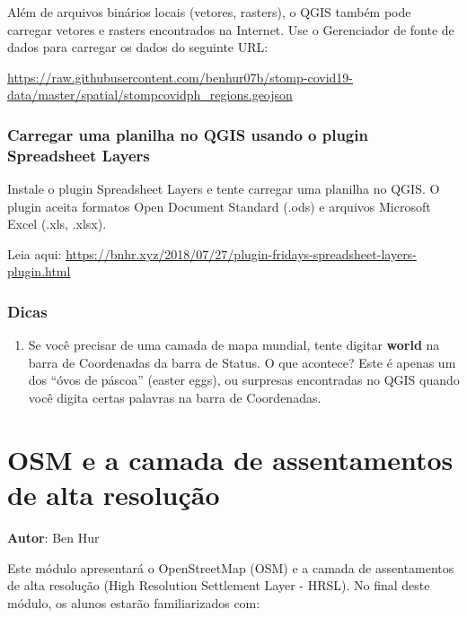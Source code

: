 \documentclass[
]{krantz}
\providecommand{\tightlist}{%
  \setlength{\itemsep}{0pt}\setlength{\parskip}{0pt}}
\begin{document}
Além de arquivos binários locais (vetores, rasters), o QGIS também pode carregar vetores e rasters encontrados na Internet. Use o Gerenciador de fonte de dados para carregar os dados do seguinte URL:

\url{https://raw.githubusercontent.com/benhur07b/stomp-covid19-data/master/spatial/stompcovidph_regions.geojson}

\hypertarget{carregar-uma-planilha-no-qgis-usando-o-plugin-spreadsheet-layers}{%
\subsection{Carregar uma planilha no QGIS usando o plugin Spreadsheet Layers}\label{carregar-uma-planilha-no-qgis-usando-o-plugin-spreadsheet-layers}}

Instale o plugin Spreadsheet Layers e tente carregar uma planilha no QGIS. O plugin aceita formatos Open Document Standard (.ods) e arquivos Microsoft Excel (.xls, .xlsx).

Leia aqui: \href{https://bnhr.xyz/2018/07/27/plugin-fridays-spreadsheet\%20-layers-plugin.html}{https://bnhr.xyz/2018/07/27/plugin-fridays-spreadsheet-layers-plugin.html}

\hypertarget{dicas}{%
\subsection{Dicas}\label{dicas}}

\begin{enumerate}
\def\labelenumi{\arabic{enumi}.}
\tightlist
\item
  Se você precisar de uma camada de mapa mundial, tente digitar \textbf{world} na barra de Coordenadas da barra de Status. O que acontece? Este é apenas um dos ``óvos de páscoa'' (easter eggs), ou surpresas encontradas no QGIS quando você digita certas palavras na barra de Coordenadas.
\end{enumerate}

\hypertarget{osm-e-a-camada-de-assentamentos-de-alta-resoluuxe7uxe3o}{%
\chapter{OSM e a camada de assentamentos de alta resolução}\label{osm-e-a-camada-de-assentamentos-de-alta-resoluuxe7uxe3o}}

\textbf{Autor}: Ben Hur

Este módulo apresentará o OpenStreetMap (OSM) e a camada de assentamentos de alta resolução (High Resolution Settlement Layer - HRSL). No final deste módulo, os alunos estarão familiarizados com:
\end{document}
